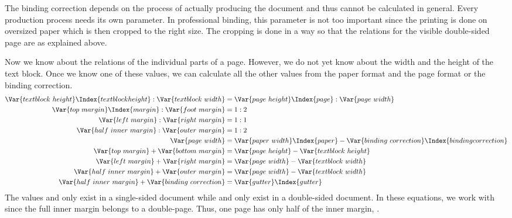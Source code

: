 \begin{Explain}
  The binding correction depends on the process of actually
  producing the document and thus cannot be calculated in general.
  Every production process needs its own parameter. In professional
  binding, this parameter is not too important since the printing is
  done on oversized paper which is then cropped to the right size.
  The cropping is done in a way so that the relations for the
  visible double-sided page are as explained above.

  Now we know about the relations of the individual parts of a page.
  However, we do not yet know about the width and the height of the
  text block. Once we know one of these values, we can calculate
  all the other values from the paper format and the page format or
  the binding correction.
  \begin{align*}
    \Var{textblock~height} \Index{textblock height} : \Var{textblock~width} &=
    \Var{page~height}\Index{page} : \Var{page~width}\\
    \Var{top~margin}\Index{margin} : \Var{foot~margin} &=
      \text{1} : \text{2} \\
%
    \Var{left~margin} : \Var{right~margin} &=  \text{1} : \text{1} \\
%
    \Var{half~inner~margin} : \Var{outer~margin} &= \text{1} : \text{2} \\
%
   \Var{page~width} &= 
      \Var{paper~width}\Index{paper} - 
      \Var{binding~correction}\Index{binding correction}\\
%
    \Var{top~margin} + \Var{bottom~margin} &=
    \Var{page~height} - \Var{textblock~height} \\
%
    \Var{left~margin} + \Var{right~margin} &=
    \Var{page~width} - \Var{textblock~width} \\
%
    \Var{half~inner~margin} + \Var{outer~margin} &=
    \Var{page~width} - \Var{textblock~width} \\
%
    \Var{half~inner~margin} + \Var{binding~correction} &=
    \Var{gutter}\Index{gutter}
  \end{align*}
  The values  and  only exist in a
  single-sided document while  and
   only exist in a double-sided document.  In these
  equations, we work with  since the full inner
  margin belongs to a double-page. Thus, one page has only half of the
  inner margin, .


\end{Explain}
